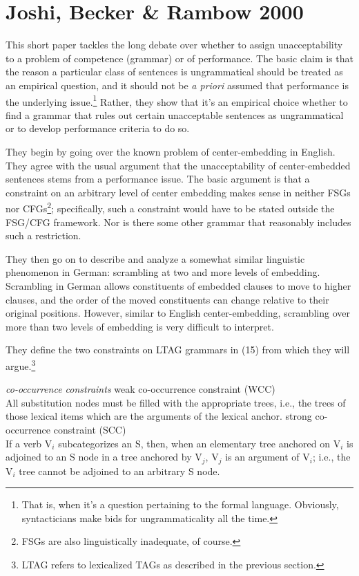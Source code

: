 \documentclass[12pt]{article}
\begin{document}
\section{Joshi, Becker \& Rambow 2000}

This short paper tackles the long debate over whether to assign unacceptability to a problem of competence (grammar) or of performance. The basic claim is that the reason a particular class of sentences is ungrammatical should be treated as an empirical question, and it should not be \textit{a priori} assumed that performance is the underlying issue.\footnote{That is, when it's a question pertaining to the formal language. Obviously, syntacticians make bids for ungrammaticality all the time.} Rather, they show that it's an empirical choice whether to find a grammar that rules out certain unacceptable sentences as ungrammatical or to develop performance criteria to do so.

They begin by going over the known problem of center-embedding in English. They agree with the usual argument that the unacceptability of center-embedded sentences stems from a performance issue. The basic argument is that a constraint on an arbitrary level of center embedding makes sense in neither FSGs nor CFGs\footnote{FSGs are also linguistically inadequate, of course.}; specifically, such a constraint would have to be stated outside the FSG/CFG framework. Nor is there some other grammar that reasonably includes such a restriction.

They then go on to describe and analyze a somewhat similar linguistic phenomenon in German: scrambling at two and more levels of embedding. Scrambling in German allows constituents of embedded clauses to move to higher clauses, and the order of the moved constituents can change relative to their original positions. However, similar to English center-embedding, scrambling over more than two levels of embedding is very difficult to interpret.

They define the two constraints on LTAG grammars in (15) from which they will argue.\footnote{LTAG refers to lexicalized TAGs as described in the previous section.}

\pex \textit{co-occurrence constraints}
\a weak co-occurrence constraint (WCC) \\ All substitution nodes must be filled with the appropriate trees, i.e., the trees of those lexical items which are the arguments of the lexical anchor.
\a strong co-occurrence constraint (SCC) \\ If a verb V$_i$ subcategorizes an S, then, when an elementary tree anchored on V$_i$ is adjoined to an S node in a tree anchored by V$_j$, V$_j$ is an argument of V$_i$; i.e., the V$_i$ tree cannot be adjoined to an arbitrary S node.
\xe
\end{document}
